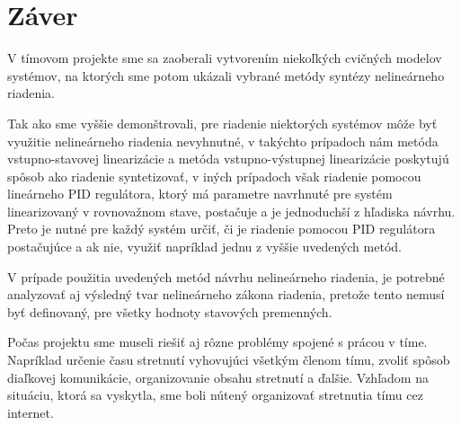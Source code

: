 \newpage
{}
{
	\section{Záver}
    V tímovom projekte sme sa zaoberali vytvorením niekoľkých cvičných modelov systémov, na ktorých sme potom ukázali vybrané metódy syntézy nelineárneho riadenia.

    Tak ako sme vyššie demonštrovali, pre riadenie niektorých systémov môže byť využitie nelineárneho riadenia nevyhnutné, v takýchto prípadoch nám metóda vstupno-stavovej linearizácie a metóda vstupno-výstupnej linearizácie poskytujú spôsob ako riadenie syntetizovať, v iných prípadoch však riadenie pomocou lineárneho PID regulátora, ktorý má parametre navrhnuté pre systém linearizovaný v rovnovažnom stave, postačuje a je jednoduchší z hľadiska návrhu. Preto je nutné pre každý systém určiť, či je riadenie pomocou PID regulátora postačujúce a ak nie, využiť napríklad jednu z vyššie uvedených metód.

    V prípade použitia uvedených metód návrhu nelineárneho riadenia, je potrebné analyzovať aj výsledný tvar nelineárneho zákona riadenia, pretože tento nemusí byť definovaný, pre všetky hodnoty stavových premenných.

    Počas projektu sme museli riešiť aj rôzne problémy spojené s prácou v tíme. Napríklad určenie času stretnutí vyhovujúci všetkým členom tímu, zvoliť spôsob diaľkovej komunikácie, organizovanie obsahu stretnutí a ďalšie. Vzhľadom na situáciu, ktorá sa vyskytla, sme boli nútený organizovať stretnutia tímu cez internet. 

}

